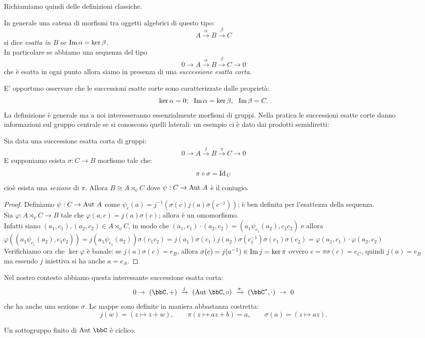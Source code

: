 Richiamiamo quindi delle definizioni classiche.

\begin{definizione} In generale una catena di morfismi tra oggetti algebrici di questo tipo:
$$ A\xrightarrow{\alpha}B\xrightarrow{\beta}C $$
si dice {\it esatta in $B$} se $\operatorname{Im}{\alpha}=\ker{\beta}$.\\
In particolare se abbiamo una sequenza del tipo
$$ 0\rightarrow A\xrightarrow{\alpha}B\xrightarrow{\beta}C \rightarrow 0 $$
che è esatta in ogni punto allora siamo in presenza di una {\it successione esatta corta}.
\end{definizione}
E' opportuno osservare che le successioni esatte corte sono caratterizzate dalle proprietà:
$$ \ker \alpha =0;\ \ \operatorname{Im}\alpha =\ker\beta,\ \ \operatorname{Im}\beta =C. $$
La definizione è generale ma a noi interesseranno essenzialmente morfismi di gruppi.
Nella pratica le successioni esatte corte danno informazioni sul gruppo centrale se si conoscono quelli laterali: un esempio ci è dato dai prodotti semidiretti:
\begin{fatto}
Sia data una successione esatta corta di gruppi:
$$ 0\rightarrow A\xrightarrow{j}B\xrightarrow{\pi}C \rightarrow 0 $$
E supponiamo esista $\sigma:C\rightarrow B$ morfismo tale che:
$$
\pi\circ \sigma=\text{Id}_{\, C}
$$
cioè esista  una {\it sezione} di $\pi$. Allora $B\cong A\rtimes_\psi C$ dove $\psi:C
\rightarrow \text{Aut } A$ è il coniugio.
\end{fatto}
\begin{proof}
    Definiamo $\psi: C\to \text{Aut } A$ come $\psi_c(a)=j^{-1}\left( \sigma(c)j(a)\sigma(c^{-1}) \right)$; è ben definita per l'esattezza della sequenza.\\
    Sia $\varphi:A\rtimes_\psi C\to B$ tale che $\varphi(a,c)=j(a)\sigma(c)$; allora è un omomorfismo.\\
    Infatti siano $(a_1,c_1),(a_2,c_2)\in A\rtimes_\psi C$, in modo che $(a_1,c_1)\cdot(a_2,c_2)=(a_1\psi_{c_1}(a_2),c_1c_2)$ e allora $\varphi((a_1\psi_{c_1}(a_2),c_1c_2))=j(a_1\psi_{c_1}(a_2))\sigma(c_1c_2)=j(a_1)\sigma(c_1)j(a_2)\sigma(c_1^{-1})\sigma(c_1)\sigma(c_2)=\varphi(a_1,c_1)\cdot\varphi(a_2,c_2)$\\
    Verifichiamo ora che $\ker\varphi$ è banale: se $j(a)\sigma(c)=e_B$, allora $\sigma(c)=j(a^{-1})\in\operatorname{Im} j=\ker \pi$ ovvero $c=\pi\sigma(c)=e_C$, quindi $j(a)=e_B$ ma essendo $j$ iniettiva si ha anche $a=e_A$.
\end{proof}

Nel nostro contesto abbiamo questa interessante successione esatta corta:
$$
0\rightarrow\ (\bbC,+)\ \xrightarrow{j}\ (\Aut{\bbC},\circ)\ \xrightarrow{\pi}\ (\bbC^*,\cdot)\  \rightarrow\ 0
$$
che ha anche una sezione $\sigma$. Le mappe sono definite in maniera abbastanza costretta:
$$
j(w)=(z\mapsto z+w),\qquad \pi(z\mapsto az+b)=a,\qquad \sigma(a)=(z\mapsto az).
$$
\begin{esercizio}
Un sottogruppo finito di $\Aut{\bbC}$ è ciclico.
\end{esercizio}


